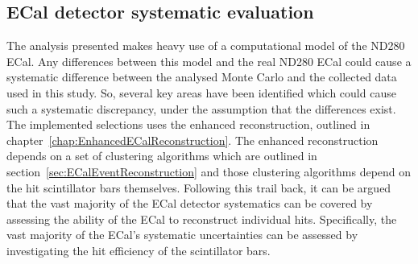 \subsection{ECal detector systematic evaluation}
\label{subsec:ECalDetectorSystematic}
The analysis presented makes heavy use of a computational model of the ND280 ECal.  Any differences between this model and the real ND280 ECal could cause a systematic difference between the analysed Monte Carlo and the collected data used in this study.  So, several key areas have been identified which could cause such a systematic discrepancy, under the assumption that the differences exist.
\newline
\newline
The implemented selections uses the enhanced reconstruction, outlined in chapter~\ref{chap:EnhancedECalReconstruction}.  The enhanced reconstruction depends on a set of clustering algorithms which are outlined in section~\ref{sec:ECalEventReconstruction} and those clustering algorithms depend on the hit scintillator bars themselves.  Following this trail back, it can be argued that the vast majority of the ECal detector systematics can be covered by assessing the ability of the ECal to reconstruct individual hits.  Specifically, the vast majority of the ECal's systematic uncertainties can be assessed by investigating the hit efficiency of the scintillator bars.  
